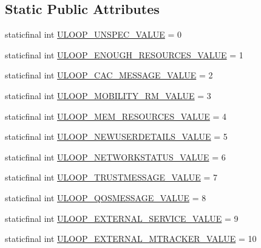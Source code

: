 \subsection*{Static Public Attributes}
\begin{DoxyCompactItemize}
\item 
staticfinal int \hyperlink{enumeu_1_1uloop_1_1messages_1_1UloopMessages_1_1UloopMessageType_a47fabf998a195f19f247304313b3f85e}{U\+L\+O\+O\+P\+\_\+\+U\+N\+S\+P\+E\+C\+\_\+\+V\+A\+L\+U\+E} = 0
\item 
staticfinal int \hyperlink{enumeu_1_1uloop_1_1messages_1_1UloopMessages_1_1UloopMessageType_a189a09fd86d165c2b0852f7c8ee625d0}{U\+L\+O\+O\+P\+\_\+\+E\+N\+O\+U\+G\+H\+\_\+\+R\+E\+S\+O\+U\+R\+C\+E\+S\+\_\+\+V\+A\+L\+U\+E} = 1
\item 
staticfinal int \hyperlink{enumeu_1_1uloop_1_1messages_1_1UloopMessages_1_1UloopMessageType_a49adc846b939f464602acea9e01c6e71}{U\+L\+O\+O\+P\+\_\+\+C\+A\+C\+\_\+\+M\+E\+S\+S\+A\+G\+E\+\_\+\+V\+A\+L\+U\+E} = 2
\item 
staticfinal int \hyperlink{enumeu_1_1uloop_1_1messages_1_1UloopMessages_1_1UloopMessageType_a01d2cd97565263fb97363f784dcf804b}{U\+L\+O\+O\+P\+\_\+\+M\+O\+B\+I\+L\+I\+T\+Y\+\_\+\+R\+M\+\_\+\+V\+A\+L\+U\+E} = 3
\item 
staticfinal int \hyperlink{enumeu_1_1uloop_1_1messages_1_1UloopMessages_1_1UloopMessageType_a55a93bf1e295176e0b5c8855804ab5f3}{U\+L\+O\+O\+P\+\_\+\+M\+E\+M\+\_\+\+R\+E\+S\+O\+U\+R\+C\+E\+S\+\_\+\+V\+A\+L\+U\+E} = 4
\item 
staticfinal int \hyperlink{enumeu_1_1uloop_1_1messages_1_1UloopMessages_1_1UloopMessageType_a41cc14787d3152d2b3e260d569366e9c}{U\+L\+O\+O\+P\+\_\+\+N\+E\+W\+U\+S\+E\+R\+D\+E\+T\+A\+I\+L\+S\+\_\+\+V\+A\+L\+U\+E} = 5
\item 
staticfinal int \hyperlink{enumeu_1_1uloop_1_1messages_1_1UloopMessages_1_1UloopMessageType_a254b62dd08201d1eba1c90bdaa0c08f7}{U\+L\+O\+O\+P\+\_\+\+N\+E\+T\+W\+O\+R\+K\+S\+T\+A\+T\+U\+S\+\_\+\+V\+A\+L\+U\+E} = 6
\item 
staticfinal int \hyperlink{enumeu_1_1uloop_1_1messages_1_1UloopMessages_1_1UloopMessageType_a8b25a66b59c2505ee11bca2164b2e83d}{U\+L\+O\+O\+P\+\_\+\+T\+R\+U\+S\+T\+M\+E\+S\+S\+A\+G\+E\+\_\+\+V\+A\+L\+U\+E} = 7
\item 
staticfinal int \hyperlink{enumeu_1_1uloop_1_1messages_1_1UloopMessages_1_1UloopMessageType_a89d68e3c0962d286dea85b6f1280b82c}{U\+L\+O\+O\+P\+\_\+\+Q\+O\+S\+M\+E\+S\+S\+A\+G\+E\+\_\+\+V\+A\+L\+U\+E} = 8
\item 
staticfinal int \hyperlink{enumeu_1_1uloop_1_1messages_1_1UloopMessages_1_1UloopMessageType_acf5d5ff984b25052735b75ec79271fba}{U\+L\+O\+O\+P\+\_\+\+E\+X\+T\+E\+R\+N\+A\+L\+\_\+\+S\+E\+R\+V\+I\+C\+E\+\_\+\+V\+A\+L\+U\+E} = 9
\item 
staticfinal int \hyperlink{enumeu_1_1uloop_1_1messages_1_1UloopMessages_1_1UloopMessageType_a4f9777bb27c76f61628926bedc37a25d}{U\+L\+O\+O\+P\+\_\+\+E\+X\+T\+E\+R\+N\+A\+L\+\_\+\+M\+T\+R\+A\+C\+K\+E\+R\+\_\+\+V\+A\+L\+U\+E} = 10
\end{DoxyCompactItemize}
